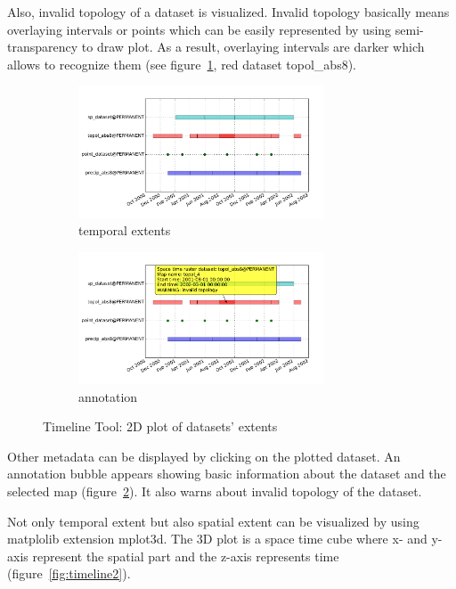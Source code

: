 \documentclass[a4paper,12pt,oneside]{book}
\begin{document}
Also, invalid topology of a dataset is visualized.
Invalid topology basically means overlaying intervals or points
which can be easily represented by using semi-transparency to draw plot.
As a result, overlaying intervals are darker
which allows to recognize them (see figure~\ref{fig:timeline1}, red dataset topol\_abs8).

\begin{figure}[ht!]
  \centering
  \begin{subfigure}[ht]{\textwidth}
  \centering
  \includegraphics[width=0.8\textwidth]{./images/timeline1.pdf}
  \caption{temporal extents}
  \label{fig:timeline1}
  \end{subfigure}

  \begin{subfigure}[ht]{\textwidth}
  \centering
  \includegraphics[width=0.8\textwidth]{./images/timeline3.pdf}
  \caption{annotation}
  \label{fig:timeline3}
  \end{subfigure}
%
\caption{Timeline Tool: 2D plot of datasets' extents}
\label{fig:timeline}
\end{figure}

Other metadata can be displayed by clicking on the plotted dataset.
An annotation bubble appears showing basic information about the dataset and the selected map (figure~\ref{fig:timeline3}).
It also warns about invalid topology of the dataset.


Not only temporal extent but also spatial extent can be visualized by using matplolib extension mplot3d.
The 3D plot is a space time cube where x- and y-axis represent the spatial part and the z-axis represents time (figure~\ref{fig:timeline2}).
\end{document}

